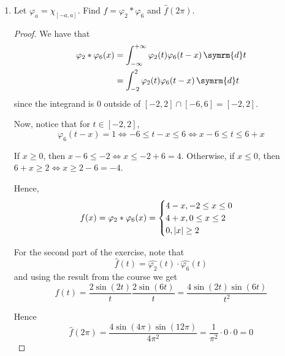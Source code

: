 \documentclass[a4paper, 12pt]{article}
\DeclarePairedDelimiter\abs{\lvert}{\rvert}%
\newcommand*\diff{\mathop{}\!\symrm{d}}
\newcommand*{\reals}{\symbb{R}}
\begin{document}
\begin{enumerate}
\begin{proof}
    Since \(f \in L^1(\reals) \cap L^2(\reals)\), by Plancherel's theorem we obtain that \(\widehat{f} \in L^2(\reals)\).
    \end{proof}
    
    \item Let \(\varphi_a = \chi_{[-a, a]}\). Find \(f = \varphi_2 \ast \varphi_6\) and \(\hat{f}(2\pi)\).
    \begin{proof}
    We have that
    \begin{align*}
        \varphi_2 \ast \varphi_6 (x) &= \int_{-\infty}^{+\infty} \varphi_2 (t) \varphi_6 (t - x) \diff t \\
        &= \int_{-2}^{2} \varphi_2(t) \varphi_6(t - x) \diff t
    \end{align*}
    since the integrand is \(0\) outside of \([-2, 2] \cap [-6, 6] = [-2, 2]\).
    
    Now, notice that for \(t \in [-2, 2]\),
    \[
        \varphi_6(t - x) = 1 \iff -6 \leq t - x \leq 6 \iff x - 6 \leq t \leq 6 + x
    \]
    
    If \(x \geq 0\), then \(x - 6 \leq - 2 \iff x \leq - 2 + 6 = 4\). Otherwise, if \(x \leq 0\), then \(6 + x \geq 2 \iff x \geq 2 - 6 = -4\).
    
    Hence,
    \[
        f(x) = \varphi_2 * \varphi_6 (x) = \begin{cases}
            4 - x, -2 \leq x \leq 0 \\
            4 + x, 0 \leq x \leq 2 \\
            0, \abs{x} \geq 2
        \end{cases}
    \]
    
    For the second part of the exercise, note that
    \[
        \widehat{f}(t) = \widehat{\varphi_2} (t) \cdot \widehat{\varphi_6} (t)
    \]
    and using the result from the course we get
    \[
        \widehat{f}(t) = \frac{2 \sin (2 t)}{t} \frac{2 \sin (6 t)}{t} = \frac{4 \sin (2t) \sin (6t)}{t^2}
    \]
    
    Hence
    \[
        \widehat{f}(2\pi) = \frac{4 \sin (4 \pi) \sin (12 \pi)}{4\pi^2} = \frac{1}{\pi^2} \cdot 0 \cdot 0 = 0
    \]
    \end{proof}
\end{enumerate}
\end{document}
